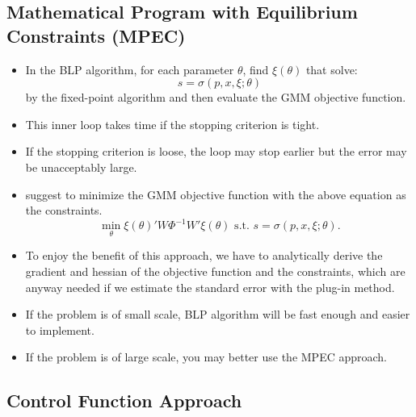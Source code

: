 \documentclass[
]{book}
\providecommand{\tightlist}{%
  \setlength{\itemsep}{0pt}\setlength{\parskip}{0pt}}
\begin{document}
\hypertarget{mathematical-program-with-equilibrium-constraints-mpec}{%
\subsection{Mathematical Program with Equilibrium Constraints (MPEC)}\label{mathematical-program-with-equilibrium-constraints-mpec}}

\begin{itemize}
\tightlist
\item
  In the BLP algorithm, for each parameter \(\theta\), find \(\xi(\theta)\) that solve:
  \begin{equation}
  s = \sigma(p, x, \xi; \theta)
  \end{equation}
  by the fixed-point algorithm and then evaluate the GMM objective function.
\item
  This inner loop takes time if the stopping criterion is tight.
\item
  If the stopping criterion is loose, the loop may stop earlier but the error may be unacceptably large.
\item
  \citet{Dube2012} suggest to minimize the GMM objective function with the above equation as the constraints.
  \begin{equation}
  \min_{\theta} \xi(\theta)' W \Phi^{-1} W' \xi(\theta) \text{   s.t.   } s = \sigma(p, x, \xi; \theta).
  \end{equation}
\item
  To enjoy the benefit of this approach, we have to analytically derive the gradient and hessian of the objective function and the constraints, which are anyway needed if we estimate the standard error with the plug-in method.
\item
  If the problem is of small scale, BLP algorithm will be fast enough and easier to implement.
\item
  If the problem is of large scale, you may better use the MPEC approach.
\end{itemize}

\hypertarget{control-function-approach}{%
\subsection{Control Function Approach}\label{control-function-approach}}
\end{document}
